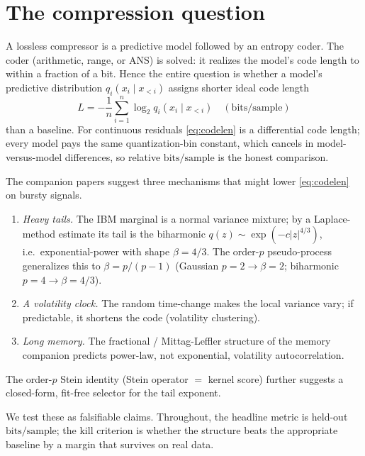 \documentclass[11pt,reqno]{amsart}
\theoremstyle{plain}
\theoremstyle{definition}
\theoremstyle{remark}
\newcommand{\bps}{\mathrm{bits/sample}}
\begin{document}
\maketitle

\section{The compression question}
\label{sec:intro}

A lossless compressor is a predictive model followed by an entropy coder. The
coder (arithmetic, range, or ANS) is solved: it realizes the model's code
length to within a fraction of a bit. Hence the entire question is whether a
model's predictive distribution $q_i(x_i\mid x_{<i})$ assigns shorter ideal
code length
\begin{equation}\label{eq:codelen}
  L = -\frac1n\sum_{i=1}^{n}\log_2 q_i(x_i\mid x_{<i})\quad(\bps)
\end{equation}
than a baseline. For continuous residuals \eqref{eq:codelen} is a differential
code length; every model pays the same quantization-bin constant, which cancels
in model-versus-model differences, so relative $\bps$ is the honest comparison.

The companion papers suggest three mechanisms that might lower
\eqref{eq:codelen} on bursty signals.
\begin{enumerate}
\item \emph{Heavy tails.} The IBM marginal is a normal variance mixture; by a
  Laplace-method estimate its tail is the biharmonic
  $q(z)\sim\exp(-c|z|^{4/3})$, i.e.\ exponential-power with shape
  $\beta=4/3$. The order-$p$ pseudo-process generalizes this to
  $\beta=p/(p-1)$ (Gaussian $p{=}2\!\to\!\beta{=}2$; biharmonic
  $p{=}4\!\to\!\beta{=}4/3$).
\item \emph{A volatility clock.} The random time-change makes the local
  variance vary; if predictable, it shortens the code (volatility clustering).
\item \emph{Long memory.} The fractional / Mittag-Leffler structure of the
  memory companion predicts power-law, not exponential, volatility
  autocorrelation.
\end{enumerate}
The order-$p$ Stein identity (Stein operator $=$ kernel score) further suggests
a closed-form, fit-free selector for the tail exponent.

We test these as falsifiable claims. Throughout, the headline metric is
held-out $\bps$; the kill criterion is whether the structure beats the
appropriate baseline by a margin that survives on real data.
\end{document}

